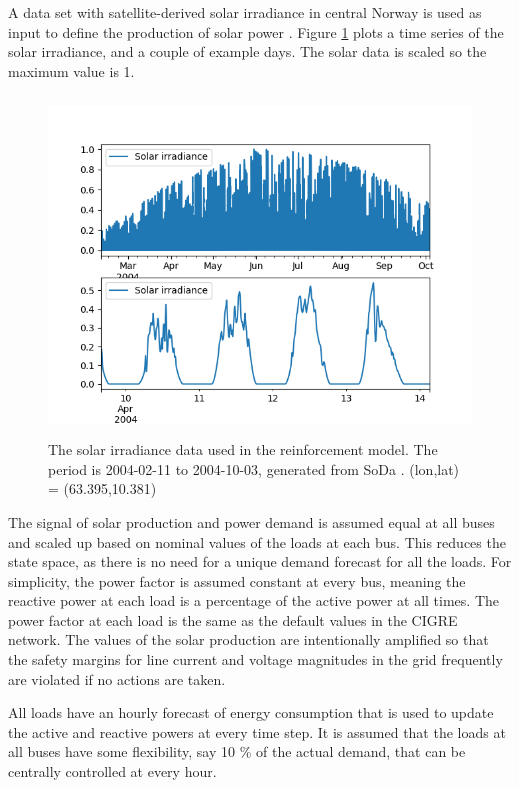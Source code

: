 \documentclass[class=book, crop=false]{standalone}
\begin{document}
A data set with satellite-derived solar irradiance in central Norway is used as input to define the production of solar power \cite{solar_data}. Figure \ref{fig:problem:solar_data} plots a time series of the solar irradiance, and a couple of example days. The solar data is scaled so the maximum value is 1.

\begin{figure}[ht]
    \center
    \includegraphics[height=9cm, width=13.5cm]{figures/solar_data.png}
    \caption[size = 9]{The solar irradiance data used in the reinforcement model. The period is 2004-02-11 to 2004-10-03, generated from SoDa \cite{solar_data}. (lon,lat) = (63.395,10.381) }
    \label{fig:problem:solar_data}
\end{figure}



The signal of solar production and power demand is assumed equal at all buses and scaled up based on nominal values of the loads at each bus. This reduces the state space, as there is no need for a unique demand forecast for all the loads.  For simplicity, the power factor is assumed constant at every bus, meaning the reactive power at each load is a percentage of the active power at all times. The power factor at each load is the same as the default values in the CIGRE network. The values of the solar production are intentionally amplified so that the safety margins for line current and voltage magnitudes in the grid frequently are violated if no actions are taken.  

All loads have an hourly forecast of energy consumption that is used to update the active and reactive powers at every time step. It is assumed that the loads at all buses have some flexibility, say 10 \% of the actual demand, that can be centrally controlled at every hour.
\end{document}

